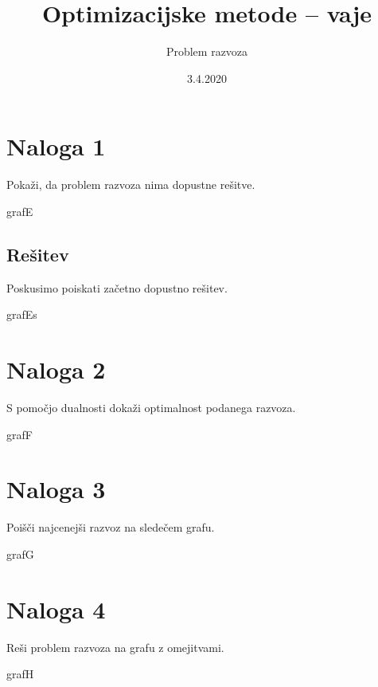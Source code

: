 \documentclass[14pt]{extarticle}
\title{Optimizacijske metode -- vaje}
\author{Problem razvoza}
\date{3.4.2020}
\begin{document}
\maketitle

\section*{Naloga 1}

Pokaži, da problem razvoza nima dopustne rešitve.

\begin{razvoz}{grafE}
\end{razvoz}

\clearpage

\subsection*{Rešitev}

Poskusimo poiskati začetno dopustno rešitev.

\begin{razvoz}{grafEs}
\end{razvoz}

\clearpage

\section*{Naloga 2}

S pomočjo dualnosti dokaži optimalnost podanega razvoza.

\begin{razvoz}{grafF}
\end{razvoz}

\clearpage

\section*{Naloga 3}

Poišči najcenejši razvoz na sledečem grafu.

\begin{razvoz}[scale=0.9]{grafG}
\end{razvoz}

\clearpage

\section*{Naloga 4}

Reši problem razvoza na grafu z omejitvami.

\begin{razvoz}[scale=0.8]{grafH}
\end{razvoz}
\end{document}
